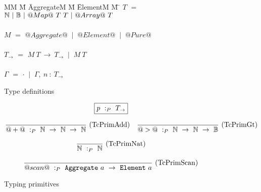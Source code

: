 
\begin{figure}

\begin{tabbing}
MM \= M \= AggregateM \= M \= ElementM \= M \= \kill
$T$
    \> $=$  \> $\mathbb{N}~|~\mathbb{B}~|~@Map@~T~T~|~@Array@~T$ \\
\\
$M$
    \> $=$  \> $@Aggregate@$ \> $~|~$ \> $@Element@$ \> $~|~$ \> $@Pure@$         \\
\\
$T_{\to}$
    \> $=$  
            \> $M~T~\to~T_{\to}$
            \> $~|~$
            \> $M~T$ \\
\\
$\Gamma$
    \> $=$  
            \> $\cdot$
            \> $~|~$
            \> $\Gamma,~n~:~T_\to$ \\
\end{tabbing}

\caption{Type definitions}
\label{fig:source:type:defs}
\end{figure}


\begin{figure}

$$
\boxed{p ~:_{P}~ T_\to}
$$


$$
\frac {\displaystyle 
} {\displaystyle  
    @+@ ~:_{P}~ \mathbb{N}~\to~\mathbb{N}~\to~\mathbb{N}
} \ 
\textrm{(TcPrimAdd)}
\quad
\frac {\displaystyle 
} {\displaystyle 
    @>@ ~:_{P}~ \mathbb{N}~\to~\mathbb{N}~\to~\mathbb{B}
} \ 
\textrm{(TcPrimGt)}
$$

$$
\frac {\displaystyle 
} {\displaystyle  
    \mathbb{N} ~:_{P}~ \mathbb{N}
} \ 
\textrm{(TcPrimNat)}
$$

$$
\frac {\displaystyle 
} {\displaystyle  
    @scan@ ~:_{P}~ \mathtt{Aggregate}~a~\to~\mathtt{Element}~a
} \ 
\textrm{(TcPrimScan)}
$$

\caption{Typing primitives}
\label{fig:source:type:prim}
\end{figure}


